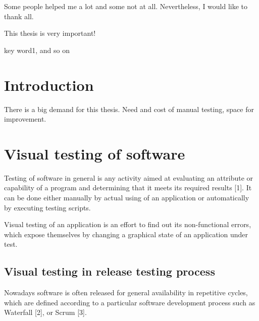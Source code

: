 \documentclass[11pt,oneside,final]{fithesis2}
\begin{document}
\newenvironment{atribut_description}
{\begin{description}
  \renewcommand{\makelabel}[1]{\texttt{\hspace{6pt}##1 $-$}}%
  \setlength{\itemsep}{1pt}
  \setlength{\parskip}{0pt}
  \setlength{\parsep}{0pt}}
{\end{description}}
\renewcommand{\tiny}{\fontsize{7.7}{9.7}\selectfont}

\FrontMatter
\ThesisTitlePage

\begin{ThesisDeclaration}
\DeclarationText
\AdvisorName
\end{ThesisDeclaration}

\begin{ThesisThanks}
Some people helped me a lot and some not at all. Nevertheless, I would like to thank all.
\end{ThesisThanks}

\begin{ThesisAbstract}
This thesis is very important!
\end{ThesisAbstract}
 
\begin{ThesisKeyWords}
key word1, and so on
\end{ThesisKeyWords}
\MainMatter
\renewcommand{\contentsname}{Table of contents}

\tableofcontents

\chapter{Introduction}    
There is a big demand for this thesis.
Need and cost of manual testing, space for improvement.
    
\chapter{Visual testing of software}    
    Testing of software in general is any activity aimed at evaluating an attribute or capability of a program and determining that it meets its required results [1]. 
    It can be done either manually by actual using of an application or automatically by executing testing scripts.
    
    Visual testing of an application is an effort to find out its non-functional errors, which expose themselves by changing a graphical state of an application under test.

  \section{Visual testing in release testing process}
  Nowadays software is often released for general availability in repetitive cycles, which are defined according to a particular software development process such as Waterfall [2], or Scrum [3].
      
\end{document}
